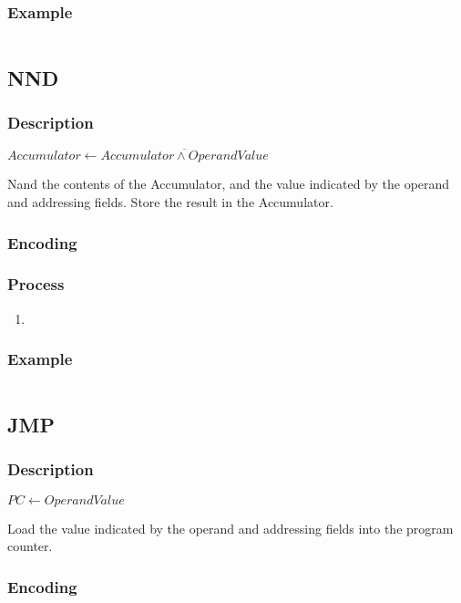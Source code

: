     \subsubsection{Example}
    \begin{verbatim}
    \end{verbatim}

\subsection{NND}\label{subsec:nand}
    \subsubsection{Description}
    $Accumulator \leftarrow \overline{Accumulator \land OperandValue}$
    \par Nand the contents of the Accumulator, and the value indicated by the operand and addressing fields.
    Store the result in the Accumulator.

    \subsubsection{Encoding}
    \subsubsection{Process}
    \begin{enumerate}
        \item
    \end{enumerate}

    \subsubsection{Example}
    \begin{verbatim}
    \end{verbatim}

\subsection{JMP}\label{subsec:jmp}
    \subsubsection{Description}
    $PC \leftarrow OperandValue$
    \par Load the value indicated by the operand and addressing fields into the program counter.
    \subsubsection{Encoding}
